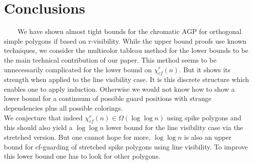 \documentclass[a4paper,USenglish,numberwithinsect]{lipics}
\theoremstyle{plain}
\begin{document}
\section{Conclusions}
\ \ \ \ We have shown almost tight bounds for the chromatic AGP for orthogonal 
simple polygons if based on r-visibility. While the upper bound proofs use known techniques, we consider the multicolor tableau method
 for the lower bounds to be the main technical contribution of our paper. This method seems to be unnecessarily complicated for the lower
 bound on $\chi_{cf}^r(n)$. But it shows its strength when applied to the line visibility case. It is this discrete structure which enables
 one to apply induction. Otherwise we would not know how to show a lower bound for a continuum of possible  guard positions with strange dependencies 
plus all possible colorings.\\
We conjecture that indeed  $\chi_{cf}^r(n)\in \Omega (\log\log n)$ using spike polygons and this should also yield a $\log\log n$ lower bound for the line visibility case via the stretched version.
But one cannot hope for more, $\log\log n$ is also an upper bound for cf-guarding of stretched spike polygons using line visibility. To improve this lower bound one has to look for other polygons. 



















\end{document}
